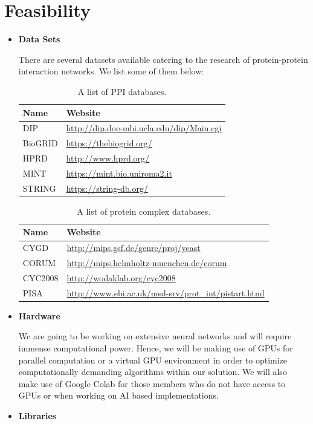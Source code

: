 \documentclass[11pt]{article}
\begin{document}
\section{Feasibility}
\label{lblFes}
\begin{itemize}
  \item \textbf{Data Sets} 
  
  There are several datasets available catering 
  to the research of protein-protein interaction networks. We list some of them below:
    \begin{table}[htpb]
      \centering
      \caption{A list of PPI databases.}
      \vspace{1 em}
      \label{tab:dataset1}
      \begin{tabular}{l|l}
      \hline
      Name & Website \\
      \hline
      DIP & \url{http://dip.doe-mbi.ucla.edu/dip/Main.cgi}\\
      BioGRID & \url{https://thebiogrid.org/} \\  
      HPRD & \url{http://www.hprd.org/} \\ 
      MINT & \url{https://mint.bio.uniroma2.it}\\
    STRING & \url{https://string-db.org/} \\
    \hline
    \end{tabular}
  \end{table}

  \begin{table}[h]
    \centering
    \caption{A list of protein complex databases.}
    \vspace{1 em}
    \label{tab:dataset2}
    \begin{tabular}{l|l}
    \hline
    Name  & Website \\
    \hline
    CYGD & \url{http://mips.gsf.de/genre/proj/yeast} \\
    CORUM & \url{http://mips.helmholtz-muenchen.de/corum}\\
    CYC2008 & \url{http://wodaklab.org/cyc2008} \\
    PISA & \url{http://www.ebi.ac.uk/msd-srv/prot_int/pistart.html} \\
    \hline
    \end{tabular}
  \end{table}
  \newpage
    \item \textbf{Hardware}\vspace{0.25em}
    
    We are going to be working on extensive neural networks and will require immense computational power. Hence, we will be making use of GPUs for parallel computation or a virtual GPU environment in order to optimize computationally demanding algorithms within our solution. We will also make use of Google Colab for those members who do not have access to GPUs or when working on AI based implementations. 
    \item \textbf{Libraries}\vspace{0.25em}
    

\end{itemize}
\end{document}
